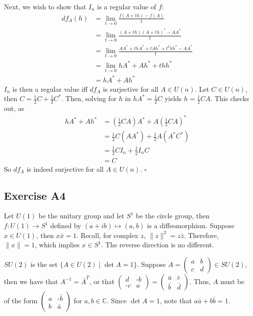 \documentclass{article}
\newcommand{\C}{\mathbb{C}}
\begin{document}
  Next, we wish to show that $I_n$ is a regular value of $f$:
  \begin{align*}
    df_A(h) &= \lim_{t\to0}\frac{f(A+th)-f(A)}{t}\\
            &= \lim_{t\to0}\frac{(A+th)(A+th)^*-AA^*}{t}\\
            &= \lim_{t\to0}\frac{AA^*+thA^*+tAh^*+t^2hh^*-AA^*}{t}\\
            &= \lim_{t\to0} hA^*+Ah^*+thh^*\\
            &= hA^*+Ah^*
  \end{align*}
  $I_n$ is then a regular value iff $df_A$ is surjective for all $A\in U(n)$.
  Let $C\in U(n)$, then $C=\frac{1}{2}C+\frac{1}{2}C^*$. Then, solving for $h$
  in $hA^*=\frac{1}{2}C$ yields $h=\frac{1}{2}CA$. This checks out, as
  \begin{align*}
    hA^*+Ah^* &= (\frac{1}{2}CA)A^*+A(\frac{1}{2}CA)^*\\
              &= \frac{1}{2}C(AA^*)+\frac{1}{2}A(A^*C^*)\\
              &= \frac{1}{2}CI_n+\frac{1}{2}I_nC\\
              &= C
  \end{align*}
  So $df_A$ is indeed surjective for all $A\in U(n)$.
  \hfill $\square$

\subsection*{Exercise A4}
  Let $U(1)$ be the unitary group and let $S^1$ be the circle group, then $f
  \colon U(1)\to S^1$ defined by $(a+ib)\mapsto (a,b)$ is a diffeomorphism.
  Suppose $x\in U(1)$, then $x\bar{x}=1$. Recall, for complex $z$, $\|z\|^2=z
  \bar{z}$. Therefore, $\|x\| = 1$, which implies $x\in S^1$. The reverse
  direction is no different.

  $SU(2)$ is the set $\{A\in U(2)\mid\det A = 1\}$. Suppose $A=
  \left(
    \begin{smallmatrix}
      a   &   b\\
      c   &   d
    \end{smallmatrix}
  \right)\in SU(2)$, then we have that $A^{-1}=\bar{A}^T$, or that
  $
  \left(
    \begin{smallmatrix}
      d           &   \text{-}b\\
      \text{-}c   &   a
    \end{smallmatrix}
  \right) =
  \left(
    \begin{smallmatrix}
      \bar{a}&\bar{c}\\
      \bar{b}&\bar{d}
    \end{smallmatrix}
  \right)
  $. Thus, $A$ must be of the form $
  \left(
    \begin{smallmatrix}
      a & \text{-}\bar{b}\\
      b & \bar{a}
    \end{smallmatrix}
  \right)
  $ for $a,b\in\C$. Since $\det A=1$, note that $a\bar{a}+b\bar{b}=1$.
\end{document}
